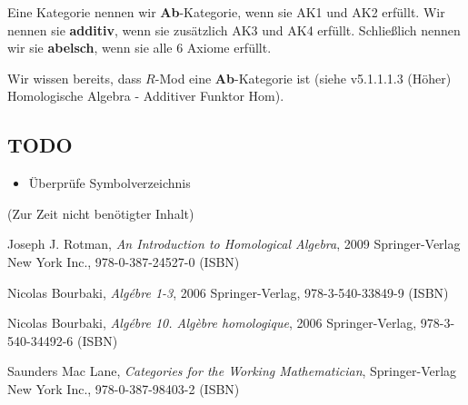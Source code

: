 \documentclass[a4paper]{amsart}
\theoremstyle{definition}
\begin{document}
Eine Kategorie nennen wir \textbf{Ab}-Kategorie, wenn sie AK1 und AK2 erfüllt. Wir nennen sie \textbf{additiv}, wenn sie zusätzlich AK3 und AK4 erfüllt. Schließlich nennen wir sie \textbf{abelsch}, wenn sie alle 6 Axiome erfüllt.

Wir wissen bereits, dass $R$-Mod eine \textbf{Ab}-Kategorie ist (siehe v5.1.1.1.3 (Höher) Homologische Algebra - Additiver Funktor Hom).

\begin{backup}
\section{TODO}
\begin{itemize}
     \item Überprüfe Symbolverzeichnis
\end{itemize}


\end{backup}

\begin{backup}
    (Zur Zeit nicht benötigter Inhalt)
\end{backup}

\begin{thebibliography}{9}
   	Joseph J. Rotman, \emph{An Introduction to Homological Algebra},
   	2009 Springer-Verlag New York Inc., 978-0-387-24527-0 (ISBN)

      Nicolas Bourbaki, \emph{Algébre 1-3},
      2006 Springer-Verlag, 978-3-540-33849-9 (ISBN)

      Nicolas Bourbaki, \emph{Algébre 10. Algèbre homologique},
      2006 Springer-Verlag, 978-3-540-34492-6 (ISBN)

      Saunders Mac Lane, \emph{Categories for the Working Mathematician},
      Springer-Verlag New York Inc., 978-0-387-98403-2 (ISBN)

\end{thebibliography}
\end{document}
